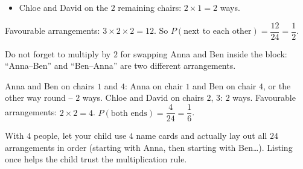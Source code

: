 {\begin{itemize}[leftmargin=1.2em,itemsep=1pt,topsep=1pt]
\item Chloe and David on the $2$ remaining chairs: $2\times1=2$ ways.
\end{itemize}
Favourable arrangements: $3\times2\times2=12$. So $P(\text{next to each other})=\dfrac{12}{24}=\dfrac12$.
\begin{warnbox}Do not forget to multiply by $2$ for swapping Anna and Ben inside the block: ``Anna--Ben'' and ``Ben--Anna'' are two different arrangements.\end{warnbox}
Anna and Ben on chairs $1$ and $4$: Anna on chair $1$ and Ben on chair $4$, or the other way round -- $2$ ways. Chloe and David on chairs $2$, $3$: $2$ ways. Favourable arrangements: $2\times2=4$.
$P(\text{both ends})=\dfrac{4}{24}=\dfrac16$.
\begin{parentbox}With $4$ people, let your child use $4$ name cards and actually lay out all $24$ arrangements in order (starting with Anna, then starting with Ben\ldots). Listing once helps the child trust the multiplication rule.\end{parentbox}
}

